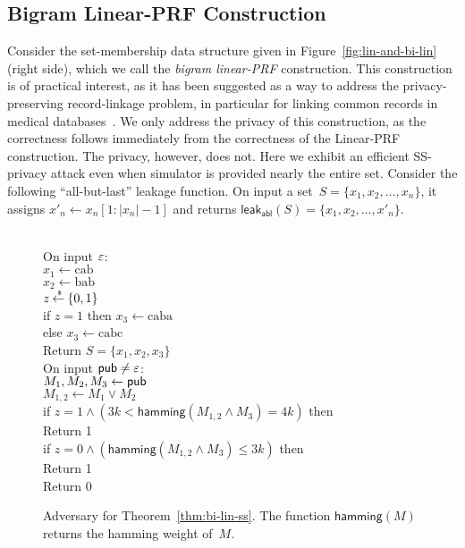 \subsection{Bigram Linear-PRF Construction}
Consider the set-membership data structure given in Figure~\ref{fig:lin-and-bi-lin} (right side), which we call the \emph{bigram linear-PRF} construction.  This construction is of practical interest, as it has been suggested as a way to address the privacy-preserving record-linkage problem, in particular for linking common records in medical databases~\cite{niedermeyer2014cryptanalysis,schnell2011novel}.
We only address the privacy of this construction, as the correctness follows immediately from the correctness of the Linear-PRF construction.  The privacy, however, does not.  Here we exhibit an efficient SS-privacy attack even when simulator is provided nearly the entire set.  Consider the following ``all-but-last'' leakage function.  On input a set~$S=\{x_1,x_2,\ldots,x_n\}$, it assigns $x'_n \gets x_n[1:|x_n|-1]$ and returns $\mathsf{leak_{abl}}(S)=\{x_1,x_2,\ldots,x'_n\}$.  

\begin{figure}[tp]
\centering
{}
{
\\[1ex]
On input $\varepsilon$:\\
\nudge $x_1 \gets \mathrm{cab}$\\
\nudge $x_2 \gets \mathrm{bab}$\\
\nudge $z {\:\stackrel{{\scriptscriptstyle \hspace{0.2em}\$}} {\leftarrow}\:} \{0,1\}$\\
\nudge if $z=1$ then $x_3 \gets \mathrm{caba}$\\
\nudge else $x_3 \gets \mathrm{cabc}$\\
\nudge Return $S=\{x_1,x_2,x_3\}$\\
On input ${\sf pub} \neq \varepsilon$:\\
\nudge $M_1,M_2,M_3 \gets {\sf pub}$\\
\nudge $M_{1,2} \gets M_1 \vee M_2$\\
\nudge if $z=1 \wedge \left(3k < \mathsf{hamming}(M_{1,2} \wedge M_3) = 4k\right)$ then \\
\nudge\nudge Return 1 \\
\nudge if $z=0 \wedge \left(\mathsf{hamming}(M_{1,2} \wedge M_3) \leq 3k\right)$ then \\
\nudge\nudge Return 1 \\
\nudge Return 0
}
\caption{Adversary for Theorem~\ref{thm:bi-lin-ss}. The function $\mathsf{hamming}(M)$ returns the hamming weight of~$M$.}
\label{fig:adv-bi-lin-ss}
\end{figure}

